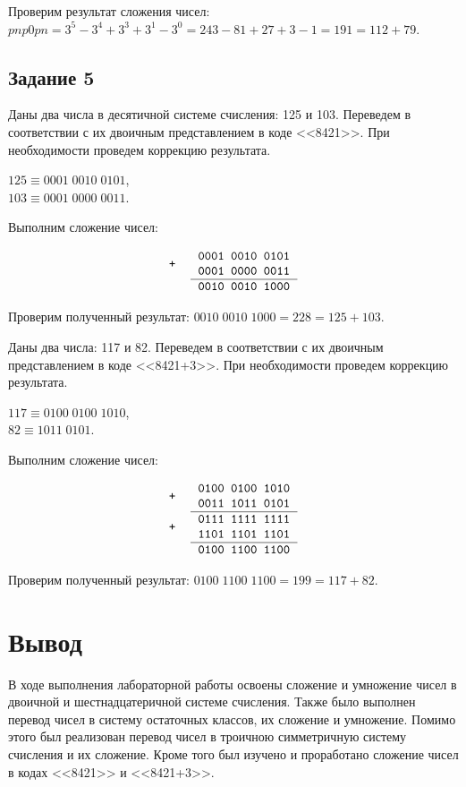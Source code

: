 \documentclass[a4paper,14pt]{extarticle}
\begin{document}
	Проверим результат сложения чисел:\\
	$pnp0pn=3^5-3^4+3^3+3^1-3^0=243-81+27+3-1=191=112+79$.
	
	\subsection*{Задание 5}
	Даны два числа в десятичной системе счисления: 125 и 103. Переведем в соответствии с их двоичным представлением в коде <<8421>>. При необходимости проведем коррекцию результата.
	
	$125 \equiv 0001\;0010\;0101$,\\
	\indent $103 \equiv 0001\;0000\;0011$.
	
	Выполним сложение чисел:
	
	\[
	\begin{tabular}{{c}{c}}
		\texttt{+} &
		\begin{tabular}{c}
			\texttt{0001~0010~0101}\\
			\texttt{0001~0000~0011}\\
			\hline
		\end{tabular}\\
		& \texttt{0010~0010~1000}
	\end{tabular}
	\]
	
	Проверим полученный результат: $0010\;0010\;1000=228=125+103$.
	
	Даны два числа: 117 и 82. Переведем в соответствии с их двоичным представлением в коде <<8421+3>>. При необходимости проведем коррекцию результата.
	
	$117 \equiv 0100\;0100\;1010$,\\
	\indent $82 \equiv 1011\;0101$.
	
	Выполним сложение чисел:
	
	\[
	\begin{tabular}{{c}{c}}
		\texttt{+} &
		\begin{tabular}{c}
			\texttt{0100~0100~1010}\\
			\texttt{0011~1011~0101}\\
			\hline
		\end{tabular}\\
		\texttt{+} &
		\begin{tabular}{c}
			\texttt{0111~1111~1111}\\
			\texttt{1101~1101~1101}\\
			\hline
		\end{tabular}\\
		& \texttt{0100~1100~1100}
	\end{tabular}
	\]
	
	Проверим полученный результат: $0100\;1100\;1100=199=117+82$.
	
	\section*{Вывод}
	В ходе выполнения лабораторной работы освоены сложение и умножение чисел в двоичной и шестнадцатеричной системе счисления. Также было выполнен перевод чисел в систему остаточных классов, их сложение и умножение. Помимо этого был реализован перевод чисел в троичною симметричную систему счисления и их сложение. Кроме того был изучено и проработано сложение чисел в кодах <<8421>> и <<8421+3>>.
	
\end{document}
